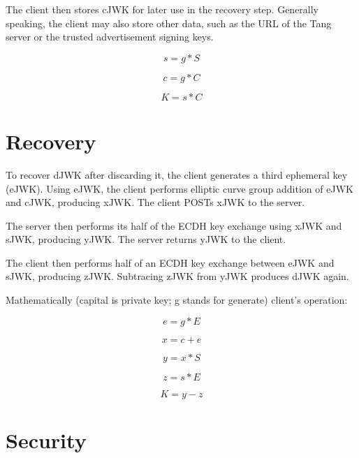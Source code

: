 The client then stores cJWK for later use in the recovery step.
Generally speaking, the client may also store other data, such as the URL of the Tang server or the trusted advertisement signing keys.

\begin{equation}
    s = g * S
\end{equation}

\begin{equation}
    c = g * C
\end{equation}

\begin{equation}
    K = s * C
\end{equation}

\section{Recovery}
To recover dJWK after discarding it, the client generates a third ephemeral key (eJWK).
Using eJWK, the client performs elliptic curve group addition of eJWK and cJWK, producing xJWK. The client POSTs xJWK to the server.

The server then performs its half of the ECDH key exchange using xJWK and sJWK, producing yJWK. The server returns yJWK to the client.

The client then performs half of an ECDH key exchange between eJWK and sJWK, producing zJWK. Subtracing zJWK from yJWK produces dJWK again.

Mathematically (capital is private key; g stands for generate) client's operation:

\begin{equation}
    e = g * E
\end{equation}

\begin{equation}
    x = c + e
\end{equation}

\begin{equation}
    y = x * S
\end{equation}

\begin{equation}
    z = s * E
\end{equation}

\begin{equation}
    K = y - z
\end{equation}

\section{Security}

